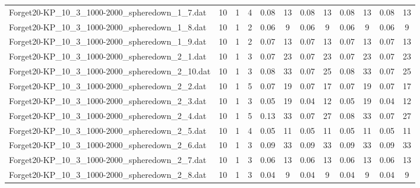 \begin{sidewaystable}[!ht]
{\begin{tabular}{lccccccccccc}
Forget20-KP\_10\_3\_1000-2000\_spheredown\_1\_7.dat & 10 & 1 & 4 &  \textcolor{blue2}{0.08} & 13 &  \textcolor{blue2}{0.08} & 13 &  \textcolor{blue2}{0.08} & 13 &  \textcolor{blue2}{0.08} & 13 \\
Forget20-KP\_10\_3\_1000-2000\_spheredown\_1\_8.dat & 10 & 1 & 2 &  \textcolor{blue2}{0.06} & 9 &  \textcolor{blue2}{0.06} & 9 &  \textcolor{blue2}{0.06} & 9 &  \textcolor{blue2}{0.06} & 9 \\
Forget20-KP\_10\_3\_1000-2000\_spheredown\_1\_9.dat & 10 & 1 & 2 &  \textcolor{blue2}{0.07} & 13 &  \textcolor{blue2}{0.07} & 13 &  \textcolor{blue2}{0.07} & 13 &  \textcolor{blue2}{0.07} & 13 \\
Forget20-KP\_10\_3\_1000-2000\_spheredown\_2\_1.dat & 10 & 1 & 3 &  \textcolor{blue2}{0.07} & 23 &  \textcolor{blue2}{0.07} & 23 &  \textcolor{blue2}{0.07} & 23 &  \textcolor{blue2}{0.07} & 23 \\
Forget20-KP\_10\_3\_1000-2000\_spheredown\_2\_10.dat & 10 & 1 & 3 & 0.08 & 33 &  \textcolor{blue2}{0.07} & 25 & 0.08 & 33 &  \textcolor{blue2}{0.07} & 25 \\
Forget20-KP\_10\_3\_1000-2000\_spheredown\_2\_2.dat & 10 & 1 & 5 &  \textcolor{blue2}{0.07} & 19 &  \textcolor{blue2}{0.07} & 17 &  \textcolor{blue2}{0.07} & 19 &  \textcolor{blue2}{0.07} & 17 \\
Forget20-KP\_10\_3\_1000-2000\_spheredown\_2\_3.dat & 10 & 1 & 3 & 0.05 & 19 &  \textcolor{blue2}{0.04} & 12 & 0.05 & 19 &  \textcolor{blue2}{0.04} & 12 \\
Forget20-KP\_10\_3\_1000-2000\_spheredown\_2\_4.dat & 10 & 1 & 5 & 0.13 & 33 &  \textcolor{blue2}{0.07} & 27 & 0.08 & 33 &  \textcolor{blue2}{0.07} & 27 \\
Forget20-KP\_10\_3\_1000-2000\_spheredown\_2\_5.dat & 10 & 1 & 4 &  \textcolor{blue2}{0.05} & 11 &  \textcolor{blue2}{0.05} & 11 &  \textcolor{blue2}{0.05} & 11 &  \textcolor{blue2}{0.05} & 11 \\
Forget20-KP\_10\_3\_1000-2000\_spheredown\_2\_6.dat & 10 & 1 & 3 &  \textcolor{blue2}{0.09} & 33 &  \textcolor{blue2}{0.09} & 33 &  \textcolor{blue2}{0.09} & 33 &  \textcolor{blue2}{0.09} & 33 \\
Forget20-KP\_10\_3\_1000-2000\_spheredown\_2\_7.dat & 10 & 1 & 3 &  \textcolor{blue2}{0.06} & 13 &  \textcolor{blue2}{0.06} & 13 &  \textcolor{blue2}{0.06} & 13 &  \textcolor{blue2}{0.06} & 13 \\
Forget20-KP\_10\_3\_1000-2000\_spheredown\_2\_8.dat & 10 & 1 & 3 &  \textcolor{blue2}{0.04} & 9 &  \textcolor{blue2}{0.04} & 9 &  \textcolor{blue2}{0.04} & 9 &  \textcolor{blue2}{0.04} & 9 \\

\end{tabular}}
\end{sidewaystable}
